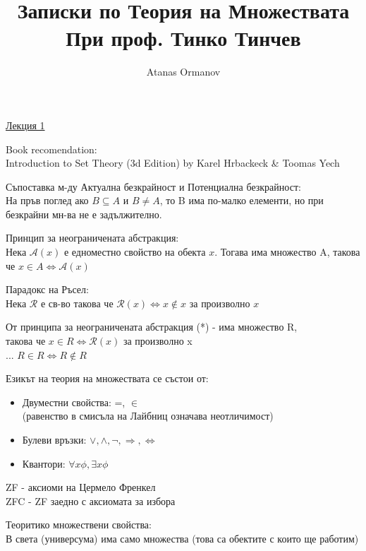 \documentclass[fleqn, titlepage, 12pt]{report}
\author{Atanas Ormanov}
\title{Записки по Теория на Множествата \\
\large При проф. Тинко Тинчев}
\begin{document}
\parindent 0pt
\maketitle

\begin{center}
  \underline{\huge\normalfont Лекция 1}
\end{center}
\bigbreak

Book recomendation:\\
Introduction to Set Theory (3d Edition) by Karel Hrbackeck \& Toomas Yech
\bigbreak

Съпоставка м-ду Актуална безкрайност и Потенциална безкрайност:\\
На пръв поглед ако $B \subseteq A$ и $B \neq A$, то B има по-малко елементи, но при безкрайни мн-ва не е задължително.
\bigbreak

 Принцип за неограничената абстракция:\\
Нека $\mathcal{A} (x)$ е едноместно свойство на обекта $x$. Тогава има множество A, такова че
$x \in A \Leftrightarrow \mathcal{A} (x)$
\bigbreak

Парадокс на Ръсел: \\
Нека $\mathcal{R}$ е св-во такова че $\mathcal{R} (x) \Leftrightarrow x \notin x$ за произволно $x$
\bigbreak

От принципа за неограничената абстракция (*) - има множество R, \\
такова че $x \in R \Leftrightarrow \mathcal{R} (x)$ за произволно x \\
... $R \in R \Leftrightarrow R \notin R$
\bigbreak

Езикът на теория на множествата се състои от:
\begin{itemize}
\item Двуместни свойства: =, $\in$ \\
(равенство в смисъла на Лайбниц означава неотличимост)
\item Булеви връзки: $\lor, \land, \lnot, \Rightarrow, \Leftrightarrow$
\item Квантори: $\forall{x}\phi, \exists{x}\phi$
\end{itemize}
ZF - аксиоми на Цермело Френкел \\
ZFC - ZF заедно с аксиомата за избора
\bigbreak

 Теоритико множествени свойства: \\
В света (универсума) има само множества (това са обектите с които ще работим)
\bigbreak
\end{document}
